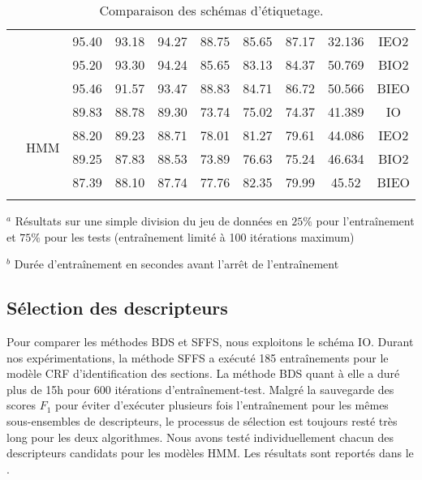 \begin{table}[ht]
\begin{center}
\begin{tabular}{p{0.9cm}|c|cccccccc}
&  & 95.40 & 93.18 & 94.27 & 88.75 & 85.65 & 87.17 & 32.136 & IEO2 \\
 &  & 95.20 & 93.30 & 94.24 & 85.65 & 83.13 & 84.37 & 50.769 & BIO2 \\
  &  & 95.46 & 91.57 & 93.47 & 88.83 & 84.71 & 86.72 & 50.566 & BIEO \\ \cline{2-10}
  & \multirow{4}{*}{HMM} & 89.83 & 88.78 & 89.30 & 73.74 & 75.02 & 74.37 &  41.389 & IO \\%
   &  & 88.20 & 89.23 & 88.71 & 78.01 & 81.27 & 79.61 & 44.086 & IEO2 \\
  &  & 89.25 & 87.83 & 88.53 & 73.89 & 76.63 & 75.24 & 46.634 & BIO2 \\
  &  & 87.39 & 88.10 & 87.74 & 77.76 & 82.35 & 79.99 & 45.52& BIEO \\ 
\noalign{\smallskip}\hline\noalign{\smallskip}
\end{tabular}
\end{center}

$^a$ Résultats sur une simple division du jeu de données en $25\%$ pour l'entraînement et  $75\%$ pour les tests (entraînement limité à 100 itérations maximum)

$^b$ Durée d'entraînement en secondes avant l'arrêt de l'entraînement

\caption{Comparaison des schémas d'étiquetage.}\label{fig:structuration:select-segm-repr}
\end{table}


\subsection{Sélection des descripteurs}
Pour comparer les méthodes BDS et SFFS, nous exploitons le schéma IO. Durant nos expérimentations, la méthode SFFS a exécuté 185 entraînements pour le modèle CRF d'identification des sections. La méthode BDS quant à elle a duré plus de 15h pour 600 itérations d'entraînement-test. Malgré la sauvegarde des scores $F_1$ pour éviter d'exécuter plusieurs fois l'entraînement pour les mêmes sous-ensembles de descripteurs, le processus de sélection est toujours resté très long pour les deux algorithmes. Nous avons testé individuellement chacun des descripteurs candidats pour les modèles HMM. Les résultats sont reportés dans le .

